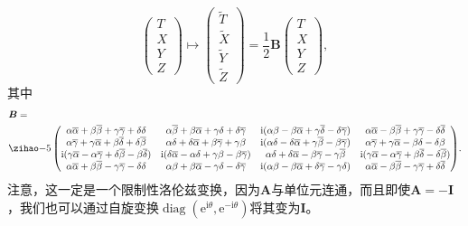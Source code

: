 \begin{equation*}
	\begin{pmatrix}
		T\\
		X\\
		Y\\
		Z
	\end{pmatrix} \mapsto \begin{pmatrix}
		\tilde{T}\\
		\tilde{X}\\
		\tilde{Y}\\
		\tilde{Z}
	\end{pmatrix} =\frac{1}{2}\boldsymbol{B}\begin{pmatrix}
		T\\
		X\\
		Y\\
		Z
	\end{pmatrix} ,
\end{equation*}
其中
\begin{equation*}
	\begin{aligned}
		& \boldsymbol{B} =\\
		& {\small\begin{pmatrix}
				\alpha \overline{\alpha } +\beta \overline{\beta } +\gamma \overline{\gamma } +\delta \delta  & \alpha \overline{\beta } +\beta \overline{\alpha } +\gamma \delta +\delta \overline{\gamma } & \mathrm{i} (\alpha \beta -\beta \overline{\alpha } +\gamma \overline{\delta } -\delta \overline{\gamma } ) & \alpha \overline{\alpha } -\beta \overline{\beta } +\gamma \overline{\gamma } -\delta \overline{\delta }\\
				\alpha \overline{\gamma } +\gamma \overline{\alpha } +\beta \overline{\delta } +\delta \overline{\beta } & \alpha \delta +\delta \overline{\alpha } +\beta \overline{\gamma } +\gamma \beta  & \mathrm{i} (\alpha \delta -\delta \overline{\alpha } +\gamma \overline{\beta } -\beta \overline{\gamma } ) & \alpha \overline{\gamma } +\gamma \overline{\alpha } -\beta \delta -\delta \beta \\
				\mathrm{i} (\gamma \overline{\alpha } -\alpha \overline{\gamma } +\delta \overline{\beta } -\beta \overline{\delta } ) & \mathrm{i} (\delta \overline{\alpha } -\alpha \delta +\gamma \beta -\beta \overline{\gamma } ) & \alpha \delta +\delta \overline{\alpha } -\beta \overline{\gamma } -\gamma \overline{\beta } & \mathrm{i} (\gamma \overline{\alpha } -\alpha \overline{\gamma } +\beta \overline{\delta } -\delta \overline{\beta } )\\
				\alpha \overline{\alpha } +\beta \overline{\beta } -\gamma \overline{\gamma } -\delta \delta  & \alpha \beta +\beta \overline{\alpha } -\gamma \delta -\delta \overline{\gamma } & \mathrm{i} (\alpha \beta -\beta \overline{\alpha } +\delta \overline{\gamma } -\gamma \delta ) & \alpha \overline{\alpha } -\beta \overline{\beta } -\gamma \overline{\gamma } +\delta \overline{\delta }
		\end{pmatrix}} .
	\end{aligned}
\end{equation*}
注意，这一定是一个限制性洛伦兹变换，因为$\boldsymbol{A}$与单位元连通，而且即使$\boldsymbol{A} =-\boldsymbol{I}$，我们也可以通过自旋变换$\operatorname{diag} (\mathrm{e}^{\mathrm{i} \theta } ,\mathrm{e}^{-\mathrm{i} \theta } )$将其变为$\boldsymbol{I}$。


